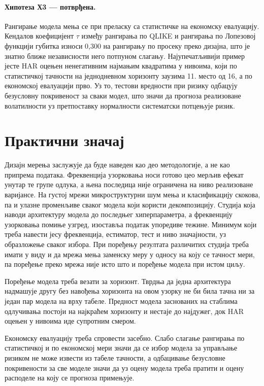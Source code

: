 \paragraph{Хипотеза Х3 — потврђена.}
Рангирање модела мења се при преласку са статистичке на економску евалуацију. Кендалов
коефицијент $\tau$ између рангирања по QLIKE и рангирања по Лопезовој функцији губитка
износи 0,300 на рангирању по просеку преко дизајна, што је знатно ближе независности
него потпуном слагању. Најупечатљивији пример јесте HAR оцењен ненегативним најмањим
квадратима у нивоима, који по статистичкој тачности на једнодневном хоризонту заузима
11. место од 16, а по економској евалуацији прво. Уз то, тестови вредности
при ризику одбацују безусловну покривеност за сваки модел, што значи да прогноза
реализоване волатилности уз претпоставку нормалности систематски потцењује ризик.

\section{Практични значај}

Дизајн мерења заслужује да буде наведен као део методологије, а не као припрема
података. Фреквенција узорковања носи готово цео мерљив ефекат унутар те групе одлука, а
њена последица није ограничена на ниво реализоване варијансе. На густој мрежи
микроструктурни шум мења и класификацију скокова, па и улазне променљиве сваког модела
који користи декомпозицију. Студија која наводи архитектуру модела до последњег
хиперпараметра, а фреквенцију узорковања помиње узгред, изоставља податак упоредиве
тежине. Минимум који треба навести јесу фреквенција, естиматор, тест и ниво значајности,
уз образложење сваког избора. При поређењу резултата различитих студија треба имати у
виду и да мрежа мења заменску меру у односу на коју се тачност мери, па поређење преко мрежа
није исто што и поређење модела при истом циљу.

Поређење модела треба везати за хоризонт. Тврдња да једна архитектура надмашује другу
без навођења хоризонта на овом узорку не би била тачна ни за један пар модела на врху
табеле. Предност модела заснованих на стаблима одлучивања постоји на најкраћем
хоризонту и нестаје до најдужег, док HAR оцењен у нивоима иде супротним смером.

Економску евалуацију треба спровести засебно. Слабо слагање рангирања по статистичкој и
по економској мери значи да се избор модела за управљање ризиком не може извести из
табеле тачности, а одбацивање безусловне покривености за све моделе значи да уз оцену
модела треба пратити и оцену расподеле на коју се прогноза примењује.

